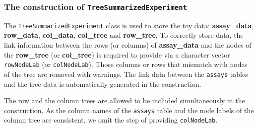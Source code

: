 \documentclass[]{article}
\newcommand{\hlnum}[1]{\textcolor[rgb]{0.816,0.125,0.439}{#1}}%
\newcommand{\hlstr}[1]{\textcolor[rgb]{0.251,0.627,0.251}{#1}}%
\newcommand{\hlcom}[1]{\textcolor[rgb]{0.502,0.502,0.502}{\textit{#1}}}%
\newcommand{\hlopt}[1]{\textcolor[rgb]{0,0,0}{#1}}%
\newcommand{\hlstd}[1]{\textcolor[rgb]{0.251,0.251,0.251}{#1}}%
\newcommand{\hlkwc}[1]{\textcolor[rgb]{0.251,0.251,0.251}{#1}}%
\newcommand{\hlkwd}[1]{\textcolor[rgb]{0.878,0.439,0.125}{#1}}%
\newenvironment{Shaded}{\begin{myshaded}}{\end{myshaded}}
\newcommand{\KeywordTok}[1]{\hlkwd{#1}}
\newcommand{\DataTypeTok}[1]{\hlkwc{#1}}
\newcommand{\DecValTok}[1]{\hlnum{#1}}
\newcommand{\StringTok}[1]{\hlstr{#1}}
\newcommand{\CommentTok}[1]{\hlcom{#1}}
\newcommand{\OperatorTok}[1]{\hlopt{#1}}
\newcommand{\NormalTok}[1]{\hlstd{#1}}
\begin{document}
\hypertarget{the-construction-of-treesummarizedexperiment}{%
\subsubsection{\texorpdfstring{The construction of \texttt{TreeSummarizedExperiment}}{The construction of TreeSummarizedExperiment}}\label{the-construction-of-treesummarizedexperiment}}

The \texttt{TreeSummarizedExperiment} class is used to store the toy data:
\textbf{assay\_data}, \textbf{row\_data}, \textbf{col\_data}, \textbf{col\_tree} and \textbf{row\_tree}, To
correctly store data, the link information between the rows (or columns) of
\textbf{assay\_data} and the nodes of the \textbf{row\_tree} (or \textbf{col\_tree}) is required
to provide via a character vector \texttt{rowNodeLab} (or \texttt{colNodeLab}). Those columns
or rows that mismatch with nodes of the tree are removed with
warnings. The link data between the \texttt{assays} tables and the tree data is
automatically generated in the construction.

The row and the column trees are allowed to be included simultaneously in the
construction. As the column names of the \texttt{assays} table and the node labels of the column tree are consistent, we omit the step of providing \texttt{colNodeLab}.

\begin{Shaded}
\end{Shaded}
\end{document}

